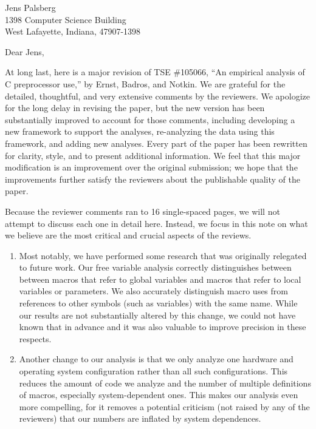 \documentclass[11pt]{letter}
\begin{document}
\signature{\mbox{Michael Ernst, Greg Badros, and David Notkin}}


\begin{letter}{Jens Palsberg \\
    1398 Computer Science Building \\
    West Lafayette, Indiana, 47907-1398}

\opening{Dear Jens,}

At long last, here is a major revision of TSE \#105066, ``An empirical
analysis of C preprocessor use,'' by Ernst, Badros, and Notkin.  We are
grateful for the detailed, thoughtful, and very extensive comments by the
reviewers.  We apologize for the long delay in revising the paper, but the
new version has been substantially improved to account for those comments,
including developing a new framework to support the analyses, re-analyzing
the data using this framework, and adding new analyses.  Every part of the
paper has been rewritten for clarity, style, and to present additional
information.  We feel that this major modification is an improvement over
the original submission; we hope that the improvements further satisfy the
reviewers about the publishable quality of the paper.

Because the reviewer comments ran to 16 single-spaced pages, we will not
attempt to discuss each one in detail here.  Instead, we focus in this note
on what we believe are the most critical and crucial aspects of the
reviews.

\begin{enumerate}

\item
  Most notably, we have performed some research that was originally
  relegated to future work.  Our free variable analysis correctly
  distinguishes between between macros that refer to global variables and
  macros that refer to local variables or parameters.  We also accurately
  distinguish macro uses from references to other symbols (such as
  variables) with the same name.  While our results are not substantially
  altered by this change, we could not have known that in advance and it
  was also valuable to improve precision in these respects.

\item
  Another change to our analysis is that we only analyze one hardware and
  operating system configuration rather than all such configurations.  This
  reduces the amount of code we analyze and the number of multiple
  definitions of macros, especially system-dependent ones.  This makes our
  analysis even more compelling, for it removes a potential criticism (not
  raised by any of the reviewers) that our numbers are inflated by system
  dependences.


\end{enumerate}
\end{letter}
\end{document}
